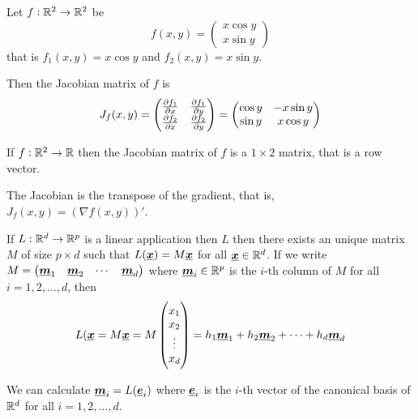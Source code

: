 \documentclass[12pt]{extarticle}
\renewcommand{\vec}[1]{\uvec{#1}}
\begin{document}
\begin{example}
    Let $f: \mathbb{R}^2 \to \mathbb{R}^2$ be
    \begin{equation}
        f(x, y) = \begin{pmatrix}
            x \cos y \\
            x \sin y
        \end{pmatrix}
    \end{equation}
    that is $f_1(x, y) = x \cos y$ and $f_2(x, y) = x \sin y$.

    Then the Jacobian matrix of $f$ is
    \begin{equation}
        J_f(x, y) = \begin{pmatrix}
            \pdv{f_1}{x}() & \pdv{f_1}{y}() \\
            \pdv{f_2}{x}() & \pdv{f_2}{y}()
        \end{pmatrix} = \begin{pmatrix}
            \cos y & -x \sin y \\
            \sin y & x \cos y
        \end{pmatrix}
    \end{equation}
\end{example}

\begin{example}[Jacobian of $f: \R^2 \to \R$]
    If $f: \R^2 \to \R$ then the Jacobian matrix of $f$ is a $1 \times 2$ matrix, that is a row vector.
\end{example}

\begin{remark}
    The Jacobian is the transpose of the gradient, that is, $J_f(x, y) = \left(\nabla f(x, y)\right)'$.
\end{remark}

\begin{lemma}
    If $L: \mathbb{R}^d \to \mathbb{R}^p$ is a linear application then $L$ then there exists an unique matrix $M$ of size $p \times d$ such that $L(\vec{x}) = M \vec{x}$ for all $\vec{x} \in \R^d$.
    If we write $M = \begin{pmatrix} \vec{m}_1 & \vec{m}_2 & \cdots & \vec{m}_d \end{pmatrix}$ where $\vec{m}_i \in \R^p$ is the $i$-th column of $M$ for all $i = 1, 2, \ldots, d$, then
    \begin{equation}
        L(\vec{x} = M\vec{x} = M \begin{pmatrix}
            x_1    \\
            x_2    \\
            \vdots \\
            x_d
        \end{pmatrix} = h_1 \vec{m}_1 + h_2 \vec{m}_2 + \cdots + h_d \vec{m}_d
    \end{equation}
\end{lemma}
\begin{remark}
    We can calculate $\vec{m}_i = L(\vec{e}_i)$ where $\vec{e}_i$ is the $i$-th vector of the canonical basis of $\mathbb{R}^d$ for all $i = 1, 2, \ldots, d$.
\end{remark}
\end{document}
